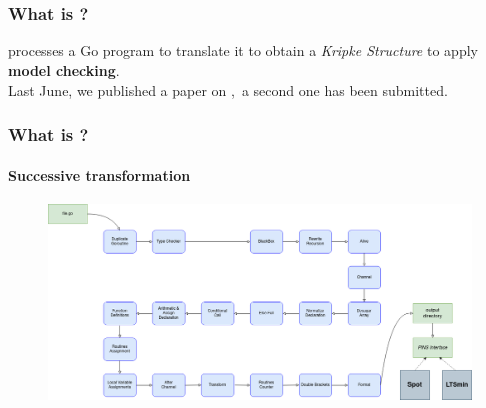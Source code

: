 \section{\gotopins}

\begin{frame}
  \frametitle{What is \gotopins?}
  \begin{center}
    \gotopins processes a Go program to translate it to obtain a
    \textit{Kripke Structure} to apply \textbf{model checking}\cite{Alur2018}.\\
    Last June, we published a paper on \gotopins\cite{kirszenberg.21.spin},\
    a second one has been submitted.
  \end{center}
\end{frame}

\begin{frame}
  \frametitle{What is \gotopins?}
  \framesubtitle{Successive transformation}
  \begin{figure}[H]
    \centering
    \includegraphics[width=11.8cm]{assets/TransformBeforeGlobal.png}
  \end{figure}
\end{frame}
